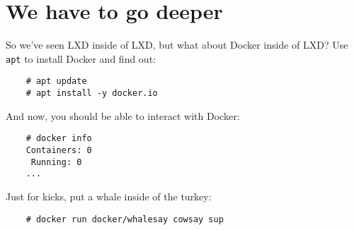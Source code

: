\section*{We have to go deeper}

So we've seen LXD inside of LXD, but what about Docker inside of LXD? Use \texttt{apt} to install Docker and find out:

\begin{verbatim}
    # apt update
    # apt install -y docker.io
\end{verbatim}

And now, you should be able to interact with Docker:

\begin{verbatim}
    # docker info
    Containers: 0
     Running: 0
    ...
\end{verbatim}

Just for kicks, put a whale inside of the turkey:

\begin{verbatim}
    # docker run docker/whalesay cowsay sup
\end{verbatim}
